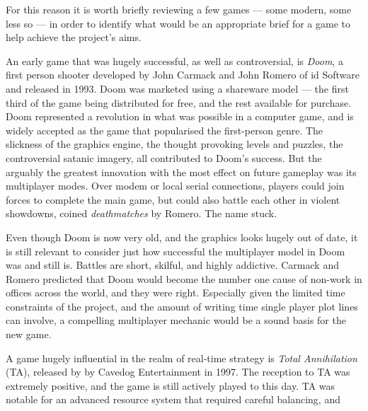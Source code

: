 For this reason it is worth briefly reviewing a few games --- some modern, some less so --- in order to identify what would be an appropriate brief for a game to help achieve the project's aims.

An early game that was hugely successful, as well as controversial, is \emph{Doom}, a first person shooter developed by John Carmack and John Romero of id Software and released in 1993. Doom was marketed using a shareware model --- the first third of the game being distributed for free, and the rest available for purchase. Doom represented a revolution in what was possible in a computer game, and is widely accepted as the game that popularised the first-person genre. The slickness of the graphics engine, the thought provoking levels and puzzles, the controversial satanic imagery, all contributed to Doom's success. But the arguably the greatest innovation with the most effect on future gameplay was its multiplayer modes. Over modem or local serial connections, players could join forces to complete the main game, but could also battle each other in violent showdowns, coined \emph{deathmatches} by Romero. The name stuck.

Even though Doom is now very old, and the graphics looks hugely out of date, it is still relevant to consider just how successful the multiplayer model in Doom was and still is. Battles are short, skilful, and highly addictive. Carmack and Romero predicted that Doom would become the number one cause of non-work in offices across the world, and they were right. Especially given the limited time constraints of the project, and the amount of writing time single player plot lines can involve, a compelling multiplayer mechanic would be a sound basis for the new game.

A game hugely influential in the realm of real-time strategy is \emph{Total Annihilation} (TA), released by by Cavedog Entertainment in 1997. The reception to TA was extremely positive, and the game is still actively played to this day. TA was notable for an advanced resource system that required careful balancing, and 



